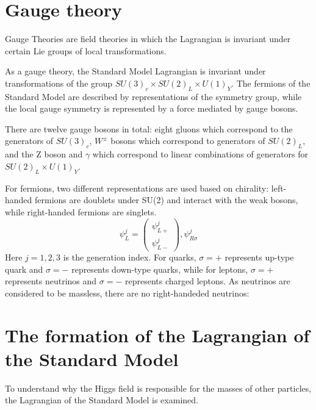 \section{Gauge theory}
\par Gauge Theories are field theories in which the Lagrangian is invariant under certain Lie groups of local transformations.
\par As a gauge theory, the Standard Model Lagrangian is invariant under transformations of the group $SU(3)_c \times SU(2)_L \times U(1)_Y$. The fermions of the Standard Model are described by representations of the symmetry group, while the local gauge symmetry is represented by a force mediated by gauge bosons.

\par There are twelve gauge bosons in total: eight gluons which correspond to the generators of $SU(3)_c$, $W^{\pm}$ bosons which correspond to generators of $SU(2)_L$, and the Z boson and $\gamma$ which correspond to linear combinations of generators for $SU(2)_L \times U(1)_Y$.

\par For fermions, two different representations are used based on chirality: left-handed fermions are doublets under SU(2) and interact with the weak bosons, while right-handed fermions are singlets.
\begin{equation}
  \psi_L^{j}=\left( \begin{smallmatrix} \psi_{L+}^{j}\\ \psi_{L-}^{j} \end{smallmatrix}\right),  \psi_{R\sigma}^{j}
  \label{eq:fermion}
\end{equation}
Here $j=1,2,3$ is the generation index. For quarks, $\sigma=+$ represents up-type quark and $\sigma=-$ represents down-type quarks, while for leptons, $\sigma=+$ represents neutrinos and $\sigma=-$ represents charged leptons. As neutrinos are considered to be massless, there are no right-handeded neutrinos:

\section{The formation of the Lagrangian of the Standard Model}
\par To understand why the Higgs field is responsible for the masses of other particles, the Lagrangian of the Standard Model is examined.

